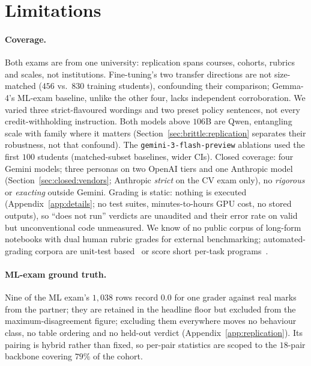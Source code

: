 \section{Limitations}
\label{sec:limitations}

\paragraph{Coverage.}
Both exams are from one university: replication spans courses, cohorts, rubrics and scales, not institutions. Fine-tuning's two transfer directions are not size-matched ($456$ vs.\ $830$ training students), confounding their comparison; Gemma-4's ML-exam baseline, unlike the other four, lacks independent corroboration. We varied three strict-flavoured wordings and two preset policy sentences, not every credit-withholding instruction. Both models above $106$B are Qwen, entangling scale with family where it matters (Section~\ref{sec:brittle:replication} separates their robustness, not that confound). The \texttt{gemini-3-flash-preview} ablations used the first $100$ students (matched-subset baselines, wider CIs). Closed coverage: four Gemini models; three personas on two OpenAI tiers and one Anthropic model (Section~\ref{sec:closed:vendors}; Anthropic \emph{strict} on the CV exam only), no \emph{rigorous} or \emph{exacting} outside Gemini. Grading is static: nothing is executed (Appendix~\ref{app:details}; no test suites, minutes-to-hours GPU cost, no stored outputs), so ``does not run'' verdicts are unaudited and their error rate on valid but unconventional code unmeasured. We know of no public corpus of long-form notebooks with dual human rubric grades for external benchmarking; automated-grading corpora are unit-test based~\citep{messer2024automatedgradingfeedbacktools} or score short per-task programs~\citep{phung2023generativeaiprogrammingeducation}.

\paragraph{ML-exam ground truth.}
Nine of the ML exam's $1{,}038$ rows record $0.0$ for one grader against real marks from the partner; they are retained in the headline floor but excluded from the maximum-disagreement figure; excluding them everywhere moves no behaviour class, no table ordering and no held-out verdict (Appendix~\ref{app:replication}). Its pairing is hybrid rather than fixed, so per-pair statistics are scoped to the $18$-pair backbone covering $79\%$ of the cohort.

